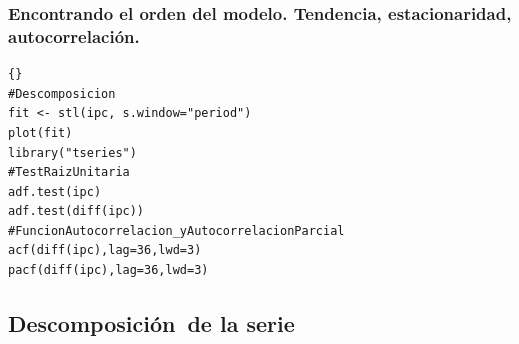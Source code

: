 \subsubsection{Encontrando el orden del modelo. Tendencia, estacionaridad, autocorrelaci\'on.}
%
%
%
\begin{lstlisting}[title={‘Código R: Tendencia, estacionaridad, autocorrelación. ’},basicstyle=\ttfamily]{}
#Descomposicion
fit <- stl(ipc, s.window="period")
plot(fit)
library("tseries")
#TestRaizUnitaria
adf.test(ipc)
adf.test(diff(ipc))
#FuncionAutocorrelacion_yAutocorrelacionParcial
acf(diff(ipc),lag=36,lwd=3)
pacf(diff(ipc),lag=36,lwd=3)
\end{lstlisting}


\subsection{Descomposici\'on\ de la serie}

